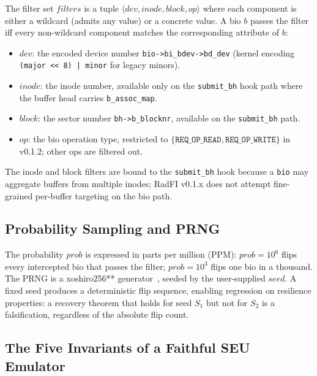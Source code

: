 \begin{definition}\label{def:filter}
The filter set \(\mathit{filters}\) is a tuple
\(\langle \mathit{dev}, \mathit{inode}, \mathit{block}, \mathit{op} \rangle\)
where each component is either a wildcard (admits any value) or a
concrete value. A bio \(b\) passes the filter iff every non-wildcard
component matches the corresponding attribute of \(b\):
\begin{itemize}
\item \(\mathit{dev}\): the encoded device number
  \texttt{bio->bi\_bdev->bd\_dev} (kernel encoding
  \texttt{(major << 8) | minor} for legacy minors).
\item \(\mathit{inode}\): the inode number, available only on the
  \texttt{submit\_bh} hook path where the buffer head carries
  \texttt{b\_assoc\_map}.
\item \(\mathit{block}\): the sector number
  \texttt{bh->b\_blocknr}, available on the \texttt{submit\_bh} path.
\item \(\mathit{op}\): the bio operation type, restricted to
  \(\{\texttt{REQ\_OP\_READ}, \texttt{REQ\_OP\_WRITE}\}\) in v0.1.2;
  other ops are filtered out.
\end{itemize}
\end{definition}

The inode and block filters are bound to the \texttt{submit\_bh}
hook because a \texttt{bio} may aggregate buffers from multiple
inodes; RadFI v0.1.x does not attempt fine-grained per-buffer
targeting on the bio path.

\subsection{Probability Sampling and PRNG}

The probability \(\mathit{prob}\) is expressed in parts per million
(PPM): \(\mathit{prob} = 10^6\) flips every intercepted bio that
passes the filter; \(\mathit{prob} = 10^3\) flips one bio in a
thousand. The PRNG is a xoshiro256** generator~\cite{blackman2021xoshiro},
seeded by the user-supplied \(\mathit{seed}\). A fixed seed produces
a deterministic flip sequence, enabling regression on resilience
properties: a recovery theorem that holds for seed \(S_1\) but not
for \(S_2\) is a falsification, regardless of the absolute flip
count.

\subsection{The Five Invariants of a Faithful SEU Emulator}\label{ssec:invariants}


